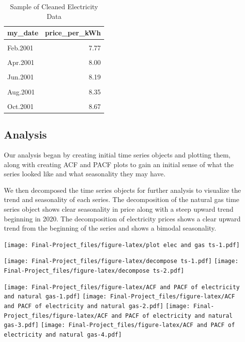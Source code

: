 \documentclass[
]{article}
\begin{document}
\begin{table}[H]

\caption{\label{tab:unnamed-chunk-2}Sample of Cleaned Electricity Data}
\centering
\begin{tabular}[t]{l|r}
\hline
my\_date & price\_per\_kWh\\
\hline
\cellcolor{gray!6}{Jan.2001} & \cellcolor{gray!6}{7.53}\\
\hline
Feb.2001 & 7.77\\
\hline
\cellcolor{gray!6}{Mar.2001} & \cellcolor{gray!6}{8.02}\\
\hline
Apr.2001 & 8.00\\
\hline
\cellcolor{gray!6}{May.2001} & \cellcolor{gray!6}{8.22}\\
\hline
Jun.2001 & 8.19\\
\hline
\cellcolor{gray!6}{Jul.2001} & \cellcolor{gray!6}{8.31}\\
\hline
Aug.2001 & 8.35\\
\hline
\cellcolor{gray!6}{Sep.2001} & \cellcolor{gray!6}{8.35}\\
\hline
Oct.2001 & 8.67\\
\hline
\end{tabular}
\end{table}

\hypertarget{analysis}{%
\subsection{Analysis}\label{analysis}}

Our analysis began by creating initial time series objects and plotting
them, along with creating ACF and PACF plots to gain an initial sense of
what the series looked like and what seasonality they may have.

We then decomposed the time series objects for further analysis to
visualize the trend and seasonality of each series. The decomposition of
the natural gas time series object shows clear seasonality in price
along with a steep upward trend beginning in 2020. The decomposition of
electricity prices shows a clear upward trend from the beginning of the
series and shows a bimodal seasonality.

\texttt{[image: Final-Project\_files/figure-latex/plot elec and gas ts-1.pdf]}

\texttt{[image: Final-Project\_files/figure-latex/decompose ts-1.pdf]}
\texttt{[image: Final-Project\_files/figure-latex/decompose ts-2.pdf]}

\texttt{[image: Final-Project\_files/figure-latex/ACF and PACF of electricity and natural gas-1.pdf]}
\texttt{[image: Final-Project\_files/figure-latex/ACF and PACF of electricity and natural gas-2.pdf]}
\texttt{[image: Final-Project\_files/figure-latex/ACF and PACF of electricity and natural gas-3.pdf]}
\texttt{[image: Final-Project\_files/figure-latex/ACF and PACF of electricity and natural gas-4.pdf]}
\end{document}
